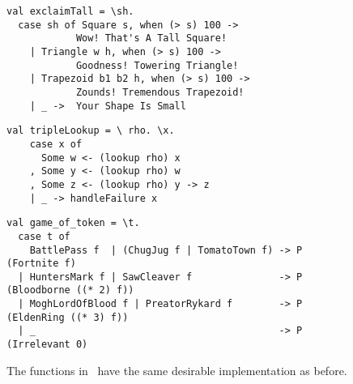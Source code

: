 \documentclass[manuscript,screen,review, 12pt, nonacm]{acmart}
\begin{document}
    \begin{figure}[ht] 
      \begin{minipage}[h]{0.54\linewidth}
        \pplst 
        \begin{lstlisting}[numbers=none, basicstyle=\tiny, xleftmargin=.2em,
          showstringspaces=false,
          frame=single]
val exclaimTall = \sh.
  case sh of Square s, when (> s) 100 -> 
            Wow! That's A Tall Square!  
    | Triangle w h, when (> s) 100 ->
            Goodness! Towering Triangle!
    | Trapezoid b1 b2 h, when (> s) 100 -> 
            Zounds! Tremendous Trapezoid!
    | _ ->  Your Shape Is Small
  \end{lstlisting}
          \label{fig:ppexclaimtall} 
      \end{minipage}%
      \begin{minipage}[h]{0.5\linewidth}
        \pplst 
        \begin{lstlisting}[numbers=none, basicstyle=\tiny, xleftmargin=2em,
                      frame=single]
  val tripleLookup = \ rho. \x.
    case x of 
      Some w <- (lookup rho) x
    , Some y <- (lookup rho) w
    , Some z <- (lookup rho) y -> z
    | _ -> handleFailure x

   \end{lstlisting}
            \label{fig:pptriplelookup} 
        \vspace{4ex}
      \end{minipage} 
      \begin{minipage}[h]{\linewidth}
        \pplst 
        \begin{lstlisting}[numbers=none, basicstyle=\tiny, xleftmargin=9em,
          showstringspaces=false,
          frame=single]
val game_of_token = \t. 
  case t of  
    BattlePass f  | (ChugJug f | TomatoTown f) -> P (Fortnite f)
  | HuntersMark f | SawCleaver f               -> P (Bloodborne ((* 2) f))
  | MoghLordOfBlood f | PreatorRykard f        -> P (EldenRing ((* 3) f))
  | _                                          -> P (Irrelevant 0)
\end{lstlisting}
          \label{fig:ppgot}
      \vspace{4ex}
      \end{minipage}%
      \caption{The functions in \PPlus\ have the same desirable implementation
      as before.}
  \label{fig:ppfuncs}
    \end{figure}        
    
\end{document}
